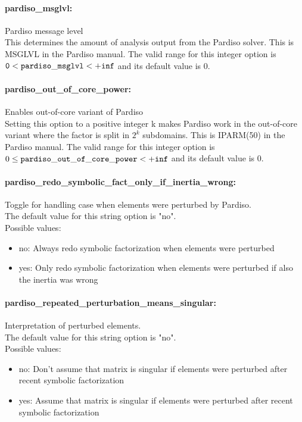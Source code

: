 \paragraph{pardiso\_msglvl:}\label{sec:pardiso_msglvl} Pardiso message level $\;$ \\
This determines the amount of analysis output from the Pardiso solver.
This is MSGLVL in the Pardiso manual.
 The valid range for this integer option is
${\tt 0} <  {\tt pardiso\_msglvl } <  {\tt +inf}$
and its default value is $0$.

\paragraph{pardiso\_out\_of\_core\_power:}\label{sec:pardiso_out_of_core_power} Enables out-of-core variant of Pardiso $\;$ \\
 Setting this option to a positive integer k makes
Pardiso work in the out-of-core variant where the
factor is split in $2^k$ subdomains.  This is
IPARM(50) in the Pardiso manual. The valid range for this integer option is
$0 \le {\tt pardiso\_out\_of\_core\_power } <  {\tt +inf}$
and its default value is $0$.


\paragraph{pardiso\_redo\_symbolic\_fact\_only\_if\_inertia\_wrong:}\label{sec:pardiso_redo_symbolic_fact_only_if_inertia_wrong} Toggle for handling case when elements were perturbed by Pardiso. $\;$ \\
The default value for this string option is "no".
\\ 
Possible values:
\begin{itemize}
   \item no: Always redo symbolic factorization when
elements were perturbed
   \item yes: Only redo symbolic factorization when elements
were perturbed if also the inertia was wrong
\end{itemize}

\paragraph{pardiso\_repeated\_perturbation\_means\_singular:}\label{sec:pardiso_repeated_perturbation_means_singular} Interpretation of perturbed elements. $\;$ \\
The default value for this string option is "no".
\\ 
Possible values:
\begin{itemize}
   \item no: Don't assume that matrix is singular if
elements were perturbed after recent symbolic
factorization
   \item yes: Assume that matrix is singular if elements were
perturbed after recent symbolic factorization
\end{itemize}

